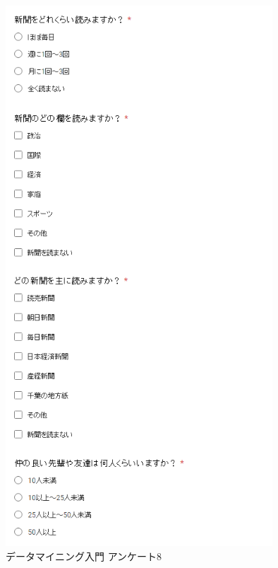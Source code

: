 \begin{figure}[p]
\centering
\includegraphics[width=10cm]{forms11.PNG}
\caption{データマイニング入門 アンケート8}\label{サンプル図}
\end{figure}

